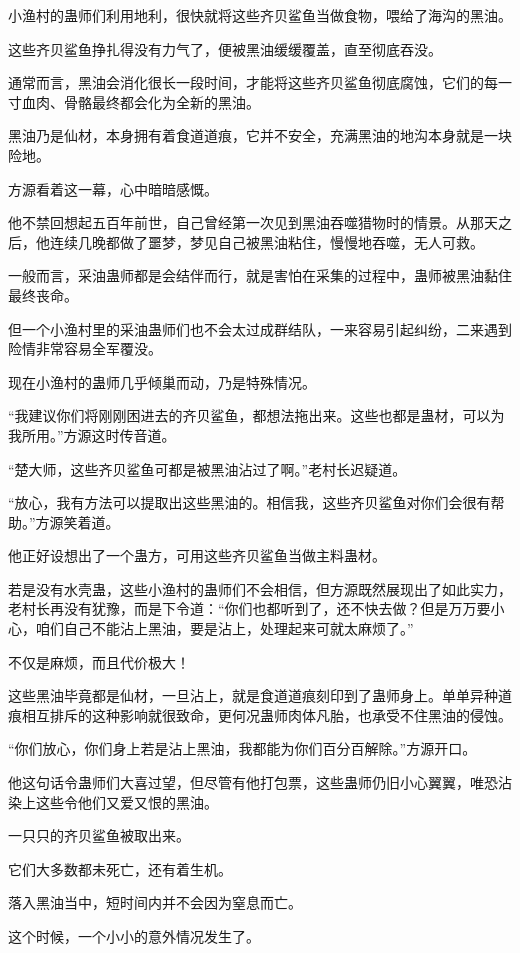 \begin{this_body}
小渔村的蛊师们利用地利，很快就将这些齐贝鲨鱼当做食物，喂给了海沟的黑油。

这些齐贝鲨鱼挣扎得没有力气了，便被黑油缓缓覆盖，直至彻底吞没。

通常而言，黑油会消化很长一段时间，才能将这些齐贝鲨鱼彻底腐蚀，它们的每一寸血肉、骨骼最终都会化为全新的黑油。

黑油乃是仙材，本身拥有着食道道痕，它并不安全，充满黑油的地沟本身就是一块险地。

方源看着这一幕，心中暗暗感慨。

他不禁回想起五百年前世，自己曾经第一次见到黑油吞噬猎物时的情景。从那天之后，他连续几晚都做了噩梦，梦见自己被黑油粘住，慢慢地吞噬，无人可救。

一般而言，采油蛊师都是会结伴而行，就是害怕在采集的过程中，蛊师被黑油黏住最终丧命。

但一个小渔村里的采油蛊师们也不会太过成群结队，一来容易引起纠纷，二来遇到险情非常容易全军覆没。

现在小渔村的蛊师几乎倾巢而动，乃是特殊情况。

“我建议你们将刚刚困进去的齐贝鲨鱼，都想法拖出来。这些也都是蛊材，可以为我所用。”方源这时传音道。

“楚大师，这些齐贝鲨鱼可都是被黑油沾过了啊。”老村长迟疑道。

“放心，我有方法可以提取出这些黑油的。相信我，这些齐贝鲨鱼对你们会很有帮助。”方源笑着道。

他正好设想出了一个蛊方，可用这些齐贝鲨鱼当做主料蛊材。

若是没有水壳蛊，这些小渔村的蛊师们不会相信，但方源既然展现出了如此实力，老村长再没有犹豫，而是下令道：“你们也都听到了，还不快去做？但是万万要小心，咱们自己不能沾上黑油，要是沾上，处理起来可就太麻烦了。”

不仅是麻烦，而且代价极大！

这些黑油毕竟都是仙材，一旦沾上，就是食道道痕刻印到了蛊师身上。单单异种道痕相互排斥的这种影响就很致命，更何况蛊师肉体凡胎，也承受不住黑油的侵蚀。

“你们放心，你们身上若是沾上黑油，我都能为你们百分百解除。”方源开口。

他这句话令蛊师们大喜过望，但尽管有他打包票，这些蛊师仍旧小心翼翼，唯恐沾染上这些令他们又爱又恨的黑油。

一只只的齐贝鲨鱼被取出来。

它们大多数都未死亡，还有着生机。

落入黑油当中，短时间内并不会因为窒息而亡。

这个时候，一个小小的意外情况发生了。


\end{this_body}
